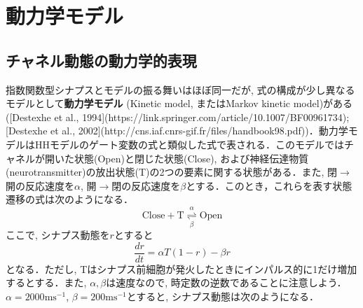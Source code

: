 \section{動力学モデル}\subsection{チャネル動態の動力学的表現}指数関数型シナプスとモデルの振る舞いはほぼ同一だが, 式の構成が少し異なるモデルとして\textbf{動力学モデル} (Kinetic model, またはMarkov kinetic model)がある ([Destexhe et al., 1994](https://link.springer.com/article/10.1007/BF00961734); [Destexhe et al., 2002](http://cns.iaf.cnrs-gif.fr/files/handbook98.pdf))．動力学モデルはHHモデルのゲート変数の式と類似した式で表される．このモデルではチャネルが開いた状態(Open)と閉じた状態(Close), および神経伝達物質(neurotransmitter)の放出状態(T)の2つの要素に関する状態がある．また, 閉$\to$開の反応速度を$\alpha$, 開$\to$閉の反応速度を$\beta$とする．このとき，これらを表す状態遷移の式は次のようになる．
$$
\begin{equation}
\text{Close}+\text{T}  \underset{\beta}{\overset{\alpha}{\rightleftharpoons}}\text{Open}    
\end{equation}
$$
ここで, シナプス動態を$r$とすると
$$
\begin{equation}
\frac{dr}{dt}=\alpha T (1-r) - \beta r
\end{equation}
$$
となる．ただし, Tはシナプス前細胞が発火したときにインパルス的に1だけ増加するとする．また, $\alpha, \beta$は速度なので, 時定数の逆数であることに注意しよう． $\alpha=2000 \text{ms}^{-1}$, $\beta=200 \text{ms}^{-1}$とすると, シナプス動態は次のようになる．